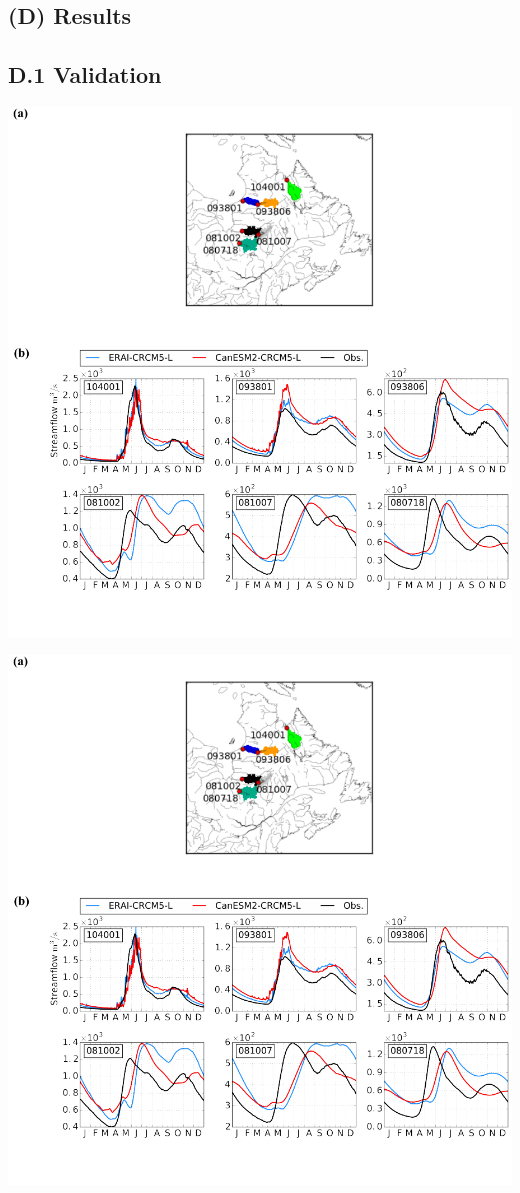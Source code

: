 \documentclass[a0,landscape]{a0poster}
\begin{document}
\begin{multicols*}{3}
\section*{(D) Results}

\subsection*{D.1 Validation}
\begin{minipage}[c]{0.45\linewidth}
\begin{center}
  \includegraphics[width=0.5\linewidth]{streamflow_validation_6_positions}
\end{center}
\end{minipage}\hfill
%
\begin{minipage}[c]{0.50\linewidth}
\begin{center}
  \includegraphics[width=0.75\linewidth]{streamflow_validation_6}

\end{center}
\end{minipage}
\end{multicols*}
\end{document}

